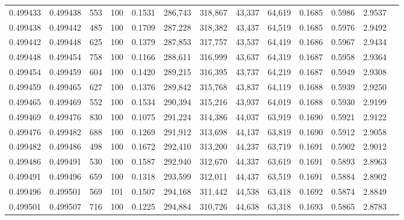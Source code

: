 \begin{tabular}{rrrrrrrrrrrrr}
0.499433 & 0.499438 &   553 & 100 &                                     0.1531 & 286,743 & 318,867 &  43,337 &  64,619 & 0.1685 & 0.5986 & 2.9537 \\
0.499438 & 0.499442 &   485 & 100 &                                     0.1709 & 287,228 & 318,382 &  43,437 &  64,519 & 0.1685 & 0.5976 & 2.9492 \\
0.499442 & 0.499448 &   625 & 100 &                                     0.1379 & 287,853 & 317,757 &  43,537 &  64,419 & 0.1686 & 0.5967 & 2.9434 \\
0.499448 & 0.499454 &   758 & 100 &                                     0.1166 & 288,611 & 316,999 &  43,637 &  64,319 & 0.1687 & 0.5958 & 2.9364 \\
0.499454 & 0.499459 &   604 & 100 &                                     0.1420 & 289,215 & 316,395 &  43,737 &  64,219 & 0.1687 & 0.5949 & 2.9308 \\
0.499459 & 0.499465 &   627 & 100 &                                     0.1376 & 289,842 & 315,768 &  43,837 &  64,119 & 0.1688 & 0.5939 & 2.9250 \\
0.499465 & 0.499469 &   552 & 100 &                                     0.1534 & 290,394 & 315,216 &  43,937 &  64,019 & 0.1688 & 0.5930 & 2.9199 \\
0.499469 & 0.499476 &   830 & 100 &                                     0.1075 & 291,224 & 314,386 &  44,037 &  63,919 & 0.1690 & 0.5921 & 2.9122 \\
0.499476 & 0.499482 &   688 & 100 &                                     0.1269 & 291,912 & 313,698 &  44,137 &  63,819 & 0.1690 & 0.5912 & 2.9058 \\
0.499482 & 0.499486 &   498 & 100 &                                     0.1672 & 292,410 & 313,200 &  44,237 &  63,719 & 0.1691 & 0.5902 & 2.9012 \\
0.499486 & 0.499491 &   530 & 100 &                                     0.1587 & 292,940 & 312,670 &  44,337 &  63,619 & 0.1691 & 0.5893 & 2.8963 \\
0.499491 & 0.499496 &   659 & 100 &                                     0.1318 & 293,599 & 312,011 &  44,437 &  63,519 & 0.1691 & 0.5884 & 2.8902 \\
0.499496 & 0.499501 &   569 & 101 &                                     0.1507 & 294,168 & 311,442 &  44,538 &  63,418 & 0.1692 & 0.5874 & 2.8849 \\
0.499501 & 0.499507 &   716 & 100 &                                     0.1225 & 294,884 & 310,726 &  44,638 &  63,318 & 0.1693 & 0.5865 & 2.8783 \\

\end{tabular}
